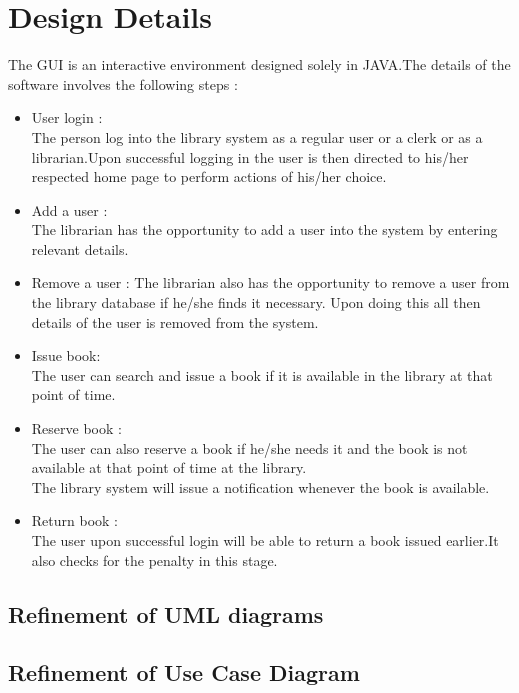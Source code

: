 \documentclass[a4paper]{article}
\begin{document}
\section{Design Details}
The GUI is an interactive environment designed solely in JAVA.The details of the software involves the following steps :
\begin{itemize}
\item User login :
\\The person log into the library system as a regular user or a clerk or as a librarian.Upon successful logging in the user is then directed to his/her respected home page to perform actions of his/her choice.
\item Add a user :
\\The librarian has the opportunity to add a user into the system by entering relevant details.
\item Remove a user :
The librarian also has the opportunity to remove a user from the library database if he/she finds it necessary. Upon doing this all then details of the user is removed from the system.
\item Issue book: 
\\The user can search and issue a book if it is available in the library at that point of time.
\item Reserve book : 
\\The user can also reserve a book if he/she needs it and the book is not available at that point of time at the library.
\\The library system will issue a notification whenever the book is available.
\item Return book : 
\\The user upon successful login will be able to return a book issued earlier.It also checks for the penalty in this stage.

\end{itemize}
\subsection{Refinement of UML diagrams}

\subsection{Refinement of Use Case Diagram}
\end{document}
